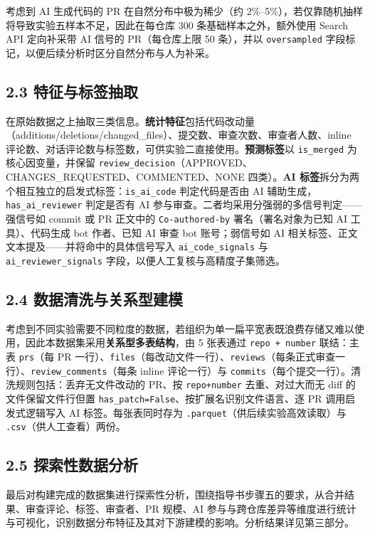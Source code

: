 \documentclass{experimentreport}
\begin{document}
{考虑到 AI 生成代码的 PR 在自然分布中极为稀少（约 2\%–5\%），若仅靠随机抽样将导致实验五样本不足，因此在每仓库 300 条基础样本之外，额外使用 Search API 定向补采带 AI 信号的 PR（每仓库上限 50 条），并以 \texttt{oversampled} 字段标记，以便后续分析时区分自然分布与人为补采。

\subsection*{2.3 特征与标签抽取}

在原始数据之上抽取三类信息。\textbf{统计特征}包括代码改动量（additions/deletions/changed\_files）、提交数、审查次数、审查者人数、inline 评论数、对话评论数与标签数，可供实验二直接使用。\textbf{预测标签}以 \texttt{is\_merged} 为核心因变量，并保留 \texttt{review\_decision}（APPROVED、CHANGES\_REQUESTED、COMMENTED、NONE 四类）。\textbf{AI 标签}拆分为两个相互独立的启发式标签：\texttt{is\_ai\_code} 判定代码是否由 AI 辅助生成，\texttt{has\_ai\_reviewer} 判定是否有 AI 参与审查。二者均采用分强弱的多信号判定——强信号如 commit 或 PR 正文中的 \texttt{Co-authored-by} 署名（署名对象为已知 AI 工具）、代码生成 bot 作者、已知 AI 审查 bot 账号；弱信号如 AI 相关标签、正文文本提及——并将命中的具体信号写入 \texttt{ai\_code\_signals} 与 \texttt{ai\_reviewer\_signals} 字段，以便人工复核与高精度子集筛选。

\subsection*{2.4 数据清洗与关系型建模}

考虑到不同实验需要不同粒度的数据，若组织为单一扁平宽表既浪费存储又难以使用，因此本数据集采用\textbf{关系型多表结构}，由 5 张表通过 \texttt{repo + number} 联结：主表 \texttt{prs}（每 PR 一行）、\texttt{files}（每改动文件一行）、\texttt{reviews}（每条正式审查一行）、\texttt{review\_comments}（每条 inline 评论一行）与 \texttt{commits}（每个提交一行）。清洗规则包括：丢弃无文件改动的 PR、按 \texttt{repo+number} 去重、对过大而无 diff 的文件保留文件行但置 \texttt{has\_patch=False}、按扩展名识别文件语言、逐 PR 调用启发式逻辑写入 AI 标签。每张表同时存为 \texttt{.parquet}（供后续实验高效读取）与 \texttt{.csv}（供人工查看）两份。

\subsection*{2.5 探索性数据分析}

最后对构建完成的数据集进行探索性分析，围绕指导书步骤五的要求，从合并结果、审查评论、标签、审查者、PR 规模、AI 参与与跨仓库差异等维度进行统计与可视化，识别数据分布特征及其对下游建模的影响。分析结果详见第三部分。

}
\end{document}
